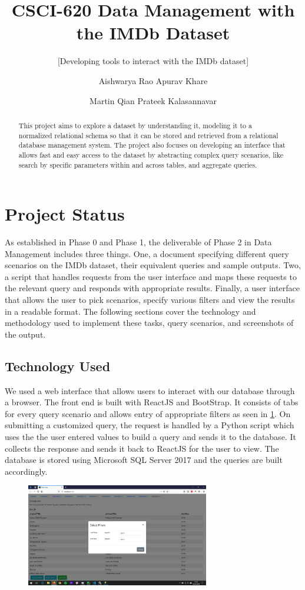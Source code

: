 \documentclass{sig-alternate}
\title{CSCI-620 Data Management with the IMDb Dataset}
\subtitle{[Developing tools to interact with the IMDb dataset]}
\author
{
	\alignauthor
	Aishwarya Rao
	\email{ar2711@rit.edu}
	\alignauthor
	Apurav Khare
	\email{ak2816@rit.edu}
	\and
	\alignauthor
	Martin Qian
	\email{jq3513@rit.edu}
	\alignauthor
	Prateek Kalasannavar
	\email{pk6685@rit.edu}
}
\begin{document}
	\maketitle
	\begin{abstract}
		This project aims to explore a dataset by understanding it, modeling it to a normalized relational schema so that it can be stored and retrieved from a relational database management system. The project also focuses on developing an interface that allows fast and easy access to the dataset by abstracting complex query scenarios, like search by specific parameters within and across tables, and aggregate queries.
	\end{abstract}
	
	\section{Project Status}
	As established in Phase 0 and Phase 1, the deliverable of Phase 2 in Data Management includes three things. One, a document specifying different query scenarios on the IMDb dataset, their equivalent queries and sample outputs. Two, a script that handles requests from the user interface and maps these requests to the relevant query and responds with appropriate results. Finally, a user interface that allows the user to pick scenarios, specify various filters and view the results in a readable format.
	The following sections cover the technology and methodology used to implement these tasks, query scenarios, and screenshots of the output. 
	\subsection{Technology Used}
	We used a web interface that allows users to interact with our database through a browser. The front end is built with ReactJS and BootStrap. It consists of tabs for every query scenario and allows entry of appropriate filters as seen in \ref{frontend}. On submitting a customized query, the request is handled by a Python script which uses the the user entered values to build a query and sends it to the database. It collects the response and sends it back to ReactJS for the user to view. \newline
	The database is stored using Microsoft SQL Server 2017 and the queries are built accordingly.
	\begin{figure}[ht]
		\includegraphics[width=8cm]{Screenshots/Frontend.png}
		\label{frontend}
		\centering
	\end{figure}
\end{document}
